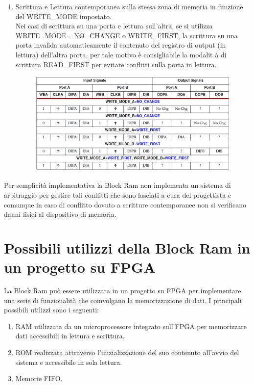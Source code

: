 \begin{enumerate}
	\item Scrittura e Lettura contemporanea sulla stessa zona di memoria in funzione del WRITE\_MODE impostato.\\
Nei casi di scrittura su una porta e lettura sull'altra, se si utilizza WRITE\_MODE= NO\_CHANGE o WRITE\_FIRST, la scrittura su una porta invalida automaticamente il contenuto del registro di output (in lettura) dell'altra porta, per tale motivo  \`e consigliabile la modalit \`a di scrittura READ\_FIRST per evitare conflitti sulla porta in lettura.

\begin{figure}[!h]
\centering
\includegraphics[width=\textwidth]{img/blockRam/conflittiScritture.jpg}
\label{fig:set_ass}
\end{figure}

\end{enumerate}

Per semplicit\`a implementativa la Block Ram non implementa un sistema di arbitraggio per gestire tali conflitti che sono lasciati a cura del progettista e comunque in caso di conflitto dovuto a scritture contemporanee non si verificano danni fisici al dispositivo di memoria. 

\section{Possibili utilizzi della Block Ram in un progetto su FPGA}
La Block Ram pu\`o essere utilizzata in un progetto su FPGA per implementare una serie di funzionalit\`a che coinvolgano la memorizzazione di dati. I principali possibili utilizzi sono i seguenti:
\begin{enumerate}
\item RAM utilizzata da un microprocessore integrato sull'FPGA per memorizzare dati accessibili in lettura e scrittura.
\item ROM realizzata attraverso l'inizializzazione del suo contenuto all'avvio del sistema e accessibile in sola lettura.
\item Memorie FIFO.
\end{enumerate}

